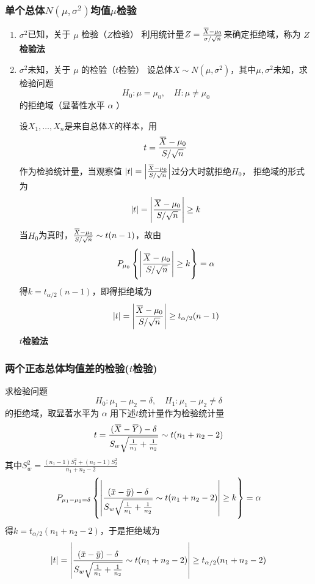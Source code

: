\documentclass[11pt]{article}
\begin{document}
\subsubsection{单个总体\(N(μ,σ^2)\)均值\(μ\)检验}
\label{sec:orgd856d3e}
\begin{enumerate}
\item \(\sigma^2\)已知，关于 \(\mu\) 检验（\(Z\)检验）
利用统计量\(Z=\frac{\bbar{X}-\mu_0}{\sigma/\sqrt{n}}\)来确定拒绝域，称为
\textbf{\(Z\)检验法}
\item \(\sigma^2\)未知，关于 \(\mu\) 的检验（\(t\)检验）
设总体\(X\sim N(\mu,\sigma^2)\)，其中\(\mu,\sigma^2\)未知，求检验问题
\begin{equation*}
H_0:\mu=\mu_0,\quad H:\mu\neq\mu_0
\end{equation*}
的拒绝域（显著性水平 \(\alpha\) ）

设\(X_1,\dots,X_n\)是来自总体\(X\)的样本，用
\begin{equation*}
t=\frac{\bbar{X}-\mu_0}{S/\sqrt{n}}
\end{equation*}
作为检验统计量，当观察值
\(\abs{t}=\abs{\frac{\bbar{X}-\mu_0}{S/\sqrt{n}}}\)过分大时就拒绝\(H_0\)，
拒绝域的形式为
\begin{equation*}
\abs{t}=\abs{\frac{\bbar{X}-\mu_0}{S/\sqrt{n}}}\ge k
\end{equation*}
当\(H_0\)为真时，\(\frac{\bbar{X}-\mu_0}{S/\sqrt{n}}\sim t(n-1)\)，故由
\begin{equation*}
P_{\mu_0}\left\{\abs{\frac{\bbar{X}-\mu_0}{S/\sqrt{n}}}\ge k
\right\}=\alpha
\end{equation*}
得\(k=t_{\alpha/2}(n-1)\)，即得拒绝域为
\begin{equation*}
\abs{t}=\abs{\frac{\bbar{X}-\mu_0}{S/\sqrt{n}}}\ge t_{\alpha/2}(n-1)
\end{equation*}
\textbf{\(t\)检验法}
\end{enumerate}
\subsubsection{两个正态总体均值差的检验(\(t\)检验)}
\label{sec:org2209934}
求检验问题
\begin{equation*}
H_0:\mu_1-\mu_2=\delta,\quad H_1:\mu_1-\mu_2\neq\delta
\end{equation*}
的拒绝域，取显著水平为 \(\alpha\)
用下述\(t\)统计量作为检验统计量
\begin{equation*}
t=\frac{(\bbar{X}-\bbar{Y})-\delta}{S_w\sqrt{\frac{1}{n_1}+\frac{1}{n_2}}}\sim t(n_1+n_2-2)
\end{equation*}
其中\(S_w^2=\frac{(n_1-1)S_1^2+(n_2-1)S_2^2}{n_1+n_2-2}\)
\begin{equation*}
P_{\mu_1-\mu_2=\delta}\left\{
\abs{\frac{(\bbar{x}-\bbar{y})-\delta}{S_w\sqrt{\frac{1}{n_1}+\frac{1}{n_2}}}\sim t(n_1+n_2-2)}
\ge k
\right\}=\alpha
\end{equation*}
得\(k=t_{\alpha/2}(n_1+n_2-2)\)，于是拒绝域为
\begin{equation*}
\abs{t}=
\abs{\frac{(\bbar{x}-\bbar{y})-\delta}{S_w\sqrt{\frac{1}{n_1}+\frac{1}{n_2}}}\sim t(n_1+n_2-2)}
\ge t_{\alpha/2}(n_1+n_2-2)
\end{equation*}
\end{document}

